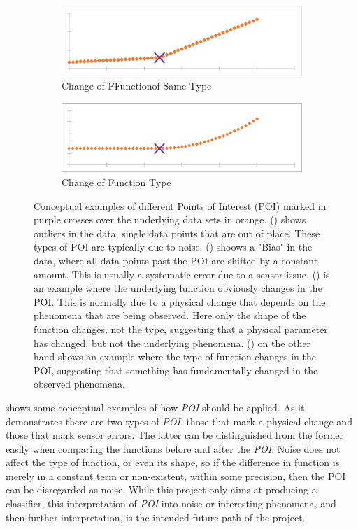 \documentclass[main.tex]{subfiles}
\begin{document}
\begin{figure}[h]
      \begin{subfigure}{0.48\linewidth}
        \centering
        \includegraphics[width=0.9\linewidth]{figures/linearPOI}
        \caption{Change of FFunctionof Same Type}
        \label{fig:poi:linear}
      \end{subfigure}
      \begin{subfigure}{0.48\linewidth}
        \centering
        \includegraphics[width=0.9\linewidth]{figures/linSquPOI}
        \caption{Change of Function Type}
        \label{fig:poi:linSqu}
      \end{subfigure}
      \caption{Conceptual examples of different Points of Interest (POI) marked in purple crosses over the underlying data sets in orange. () shows outliers in the data, single data points that are out of place. These types of POI are typically due to noise. () shoows a "Bias" in the data, where all data points past the POI are shifted by a constant amount. This is usually a systematic error due to a sensor issue. () is an example where the underlying function obviously changes in the POI. This is normally due to a physical change that depends on the phenomena that are being observed. Here only the shape of the function changes, not the type, suggesting that a physical parameter has changed, but not the underlying phenomena. () on the other hand shows an example where the type of function changes in the POI, suggesting that something has fundamentally changed in the observed phenomena.}
      \label{fig:poi}
    \end{figure}
    
     shows some conceptual examples of how \textit{POI} should be applied. As it demonstrates there are two types of \textit{POI}, those that mark a physical change and those that mark sensor errors. The latter can be distinguished from the former easily when comparing the functions before and after the \textit{POI}. Noise does not affect the type of function, or even its shape, so if the difference in function is merely in a constant term or non-existent, within some precision, then the POI can be disregarded as noise. While this project only aims at producing a classifier, this interpretation of \textit{POI} into noise or interesting phenomena, and then further interpretation, is the intended future path of the project.
    
\end{document}
